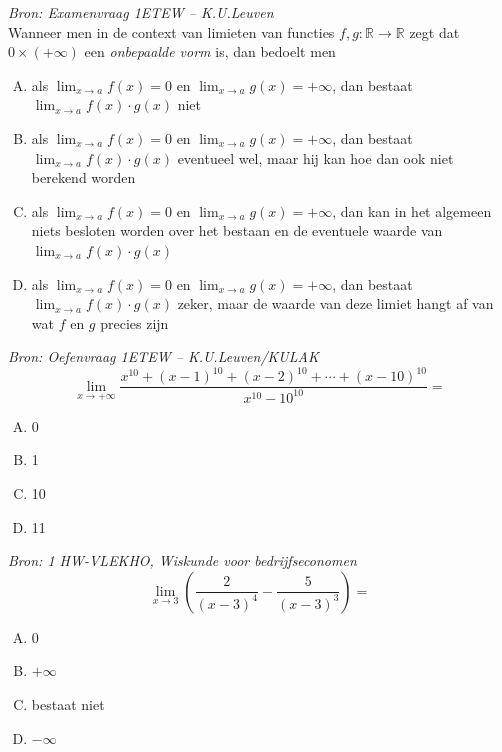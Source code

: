 \documentclass[12pt,twoside,a4paper]{article}
\begin{document}
\begin{oefening}{\em\small Bron: Examenvraag 1ETEW -- K.U.Leuven}\\
Wanneer men in de context van limieten van functies $f,g:\mathbb{R}\to\mathbb{R}$ zegt dat $0\times(+\infty)$ een
{\em onbepaalde vorm} is, dan bedoelt men
  \begin{enumerate}[(A)]
  \itemsep1em
  \item als $\lim_{x\to a}f(x)=0$ en $\lim_{x\to a}g(x)=+\infty$, dan bestaat $\lim_{x\to a}f(x)\cdot g(x)$ niet
  \item als $\lim_{x\to a}f(x)=0$ en $\lim_{x\to a}g(x)=+\infty$, dan bestaat $\lim_{x\to a}f(x)\cdot g(x)$ eventueel wel, maar hij kan hoe dan ook niet berekend worden
  \item als $\lim_{x\to a}f(x)=0$ en $\lim_{x\to a}g(x)=+\infty$, dan kan in het algemeen niets besloten worden over het bestaan en de eventuele waarde van $\lim_{x\to a}f(x)\cdot g(x)$
  \item als $\lim_{x\to a}f(x)=0$ en $\lim_{x\to a}g(x)=+\infty$, dan bestaat $\lim_{x\to a}f(x)\cdot g(x)$ zeker, maar de waarde van deze limiet hangt af van wat $f$ en $g$ precies zijn
  \end{enumerate}
\end{oefening}

\begin{oefening}{\em\small Bron: Oefenvraag 1ETEW -- K.U.Leuven/KULAK}\\
$$\lim_{x\to+\infty}\dfrac{x^{10}+(x-1)^{10}+(x-2)^{10}+\cdots+(x-10)^{10}}{x^{10}-10^{10}}=$$
  \begin{enumerate}[(A)]
  \itemsep1em
  \item 0
  \item 1
  \item 10
  \item 11
  \end{enumerate}
\end{oefening}

\begin{oefening}{\em\small Bron: 1 HW-VLEKHO, Wiskunde voor bedrijfseconomen}\\
$$\lim_{x\to3}\left(\dfrac{2}{\left(x-3\right)^4}-\dfrac{5}{\left(x-3\right)^3}\right)=$$
  \begin{enumerate}[(A)]
  \itemsep1em
  \item 0
  \item $+\infty$
  \item bestaat niet
  \item $-\infty$
  \end{enumerate}
\end{oefening}
\end{document}
